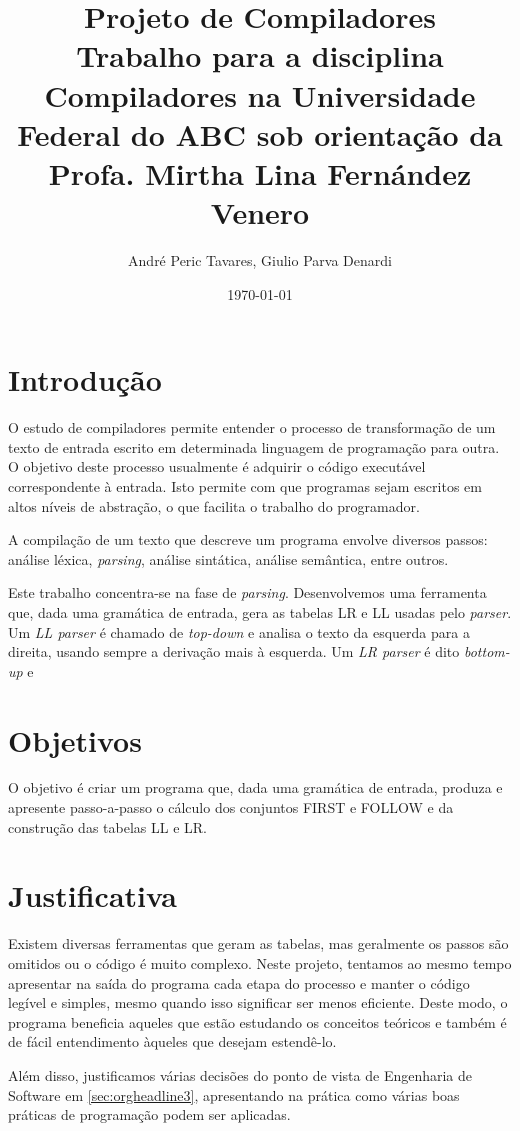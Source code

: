 \documentclass[11pt]{article}
\author{André Peric Tavares, Giulio Parva Denardi}
\date{\today}
\title{Projeto de Compiladores\\\medskip
\large Trabalho para a disciplina Compiladores na Universidade Federal do ABC sob orientação da Profa. Mirtha Lina Fernández Venero}
\begin{document}
\maketitle
\tableofcontents


\section{Introdução}
\label{sec:orgheadline1}
O estudo de compiladores permite entender o processo de transformação de um
texto de entrada escrito em determinada linguagem de programação para outra. O
objetivo deste processo usualmente é adquirir o código executável correspondente
à entrada. Isto permite com que programas sejam escritos em altos níveis de
abstração, o que facilita o trabalho do programador.

A compilação de um texto que descreve um programa envolve diversos passos:
análise léxica, \emph{parsing}, análise sintática, análise semântica, entre outros.

Este trabalho concentra-se na fase de \emph{parsing}. Desenvolvemos uma ferramenta
que, dada uma gramática de entrada, gera as tabelas LR e LL usadas pelo
\emph{parser}. Um \emph{LL parser}  é chamado de \emph{top-down} e analisa o texto da esquerda
para a direita, usando sempre a derivação mais à esquerda. Um \emph{LR parser} é dito
\emph{bottom-up} e 

\section{Objetivos}
\label{sec:orgheadline2}
O objetivo é criar um programa que, dada uma gramática de entrada,
produza e apresente passo-a-passo o cálculo dos conjuntos FIRST e FOLLOW e da
construção das tabelas LL e LR.
\section{Justificativa}
\label{sec:orgheadline4}
Existem diversas ferramentas que geram as tabelas, mas geralmente os passos são
omitidos ou o código é muito complexo. Neste projeto, tentamos ao mesmo tempo
apresentar na saída do programa cada etapa do processo e manter o código
legível e simples, mesmo quando isso significar ser menos eficiente. Deste modo,
o programa beneficia aqueles que estão estudando os conceitos teóricos e também
é de fácil entendimento àqueles que desejam estendê-lo.

Além disso, justificamos várias decisões do ponto de vista de Engenharia de
Software em \ref{sec:orgheadline3}, apresentando na
prática como várias boas práticas de programação podem ser aplicadas.
\end{document}
